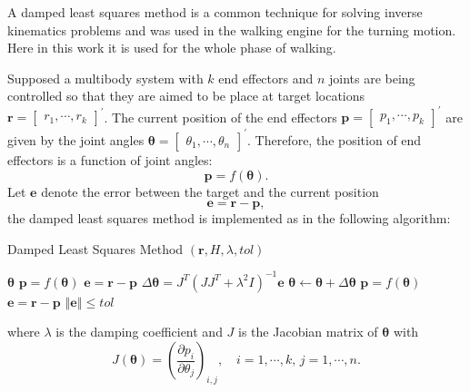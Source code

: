 A damped least squares method is a common technique for solving inverse kinematics problems
\cite{wampler1986manipulator}
\cite{buss2004introduction} and was used in the walking engine 
\cite{hengst2014runswift}for the turning motion. Here in this work it is used for the whole phase of walking.

Supposed a multibody system with $ k $ end effectors and $ n $ joints are being controlled so that they are aimed to be place at target locations 
$ \bm{r}= \begin{bmatrix}
r_1,\cdots, r_k
\end{bmatrix}^\prime$. The current position of the end effectors 
$ \bm{p}=\begin{bmatrix}
p_1,\cdots, p_k
\end{bmatrix}^\prime $ are given by the joint angles 
$ \bm{\theta}=
\begin{bmatrix}
\theta_1, \cdots, \theta_n
\end{bmatrix}^\prime $. Therefore, the position of end effectors is a function of joint angles:
\begin{equation}
\bm{p}=f(\bm{\theta}).
\end{equation}
Let $ \bm{e} $ denote the error between the target and the current position 
\begin{equation}
\bm{e} = \bm{r} -\bm{p},
\end{equation}
the damped least squares method is implemented as in the following algorithm:

\begin{algorithm}[H]  
	\label{DLSM}
	\caption{Damped Least Squares Method $(\bm{r}, H, \lambda, \mathit{tol})$}
	\begin{algorithmic}[1]
		\STATE {} $ \bm{\theta} $ 
		\STATE $ \bm{p}=f(\bm{\theta}) $
		\STATE $ \bm{e}=\bm{r}-\bm{p} $
		\REPEAT 
		\STATE	$ \Delta\bm{\theta}=J^T(JJ^T+\lambda^2I)^{-1}\bm{e} $
		\STATE $ \bm{\theta} \gets \bm{\theta}+\Delta\bm{\theta}$
		\STATE $ \bm{p}=f(\bm{\theta}) $
		\STATE $ \bm{e}=\bm{r}-\bm{p} $
		\UNTIL $ \left\Vert\bm{e}\right\Vert \leqslant tol$
	\end{algorithmic}  
\end{algorithm}
where $ \lambda $ is the damping coefficient and $ J $ is the Jacobian matrix of $ \bm{\theta} $ with
\begin{equation}
J(\bm{\theta})=(\frac{\partial p_i}{\partial \theta_j})_{i,j}, \quad i = 1, \cdots, k, \, j = 1, \cdots, n.
\end{equation}

